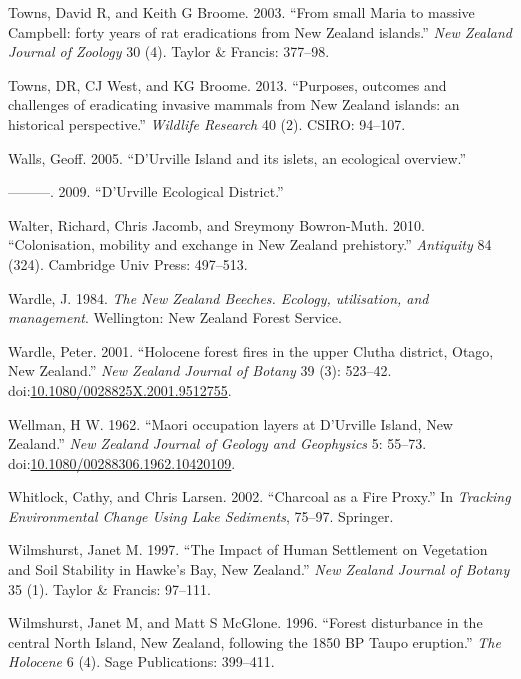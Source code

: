 \hypertarget{ref-towns2003small}{}
Towns, David R, and Keith G Broome. 2003. ``From small Maria to massive
Campbell: forty years of rat eradications from New Zealand islands.''
\emph{New Zealand Journal of Zoology} 30 (4). Taylor \& Francis:
377--98.

\hypertarget{ref-towns2013purposes}{}
Towns, DR, CJ West, and KG Broome. 2013. ``Purposes, outcomes and
challenges of eradicating invasive mammals from New Zealand islands: an
historical perspective.'' \emph{Wildlife Research} 40 (2). CSIRO:
94--107.

\hypertarget{ref-wallsb}{}
Walls, Geoff. 2005. ``D'Urville Island and its islets, an ecological
overview.''

\hypertarget{ref-walls}{}
---------. 2009. ``D'Urville Ecological District.''

\hypertarget{ref-walter2010colonisation}{}
Walter, Richard, Chris Jacomb, and Sreymony Bowron-Muth. 2010.
``Colonisation, mobility and exchange in New Zealand prehistory.''
\emph{Antiquity} 84 (324). Cambridge Univ Press: 497--513.

\hypertarget{ref-Wardle1984}{}
Wardle, J. 1984. \emph{The New Zealand Beeches. Ecology, utilisation,
and management}. Wellington: New Zealand Forest Service.

\hypertarget{ref-Wardle2001}{}
Wardle, Peter. 2001. ``Holocene forest fires in the upper Clutha
district, Otago, New Zealand.'' \emph{New Zealand Journal of Botany} 39
(3): 523--42.
doi:\href{https://doi.org/10.1080/0028825X.2001.9512755}{10.1080/0028825X.2001.9512755}.

\hypertarget{ref-Wellman1962}{}
Wellman, H W. 1962. ``Maori occupation layers at D'Urville Island, New
Zealand.'' \emph{New Zealand Journal of Geology and Geophysics} 5:
55--73.
doi:\href{https://doi.org/10.1080/00288306.1962.10420109}{10.1080/00288306.1962.10420109}.

\hypertarget{ref-whitlock2002charcoal}{}
Whitlock, Cathy, and Chris Larsen. 2002. ``Charcoal as a Fire Proxy.''
In \emph{Tracking Environmental Change Using Lake Sediments}, 75--97.
Springer.

\hypertarget{ref-wilmshurst1997impact}{}
Wilmshurst, Janet M. 1997. ``The Impact of Human Settlement on
Vegetation and Soil Stability in Hawke's Bay, New Zealand.'' \emph{New
Zealand Journal of Botany} 35 (1). Taylor \& Francis: 97--111.

\hypertarget{ref-Wilmshurst1996}{}
Wilmshurst, Janet M, and Matt S McGlone. 1996. ``Forest disturbance in
the central North Island, New Zealand, following the 1850 BP Taupo
eruption.'' \emph{The Holocene} 6 (4). Sage Publications: 399--411.

